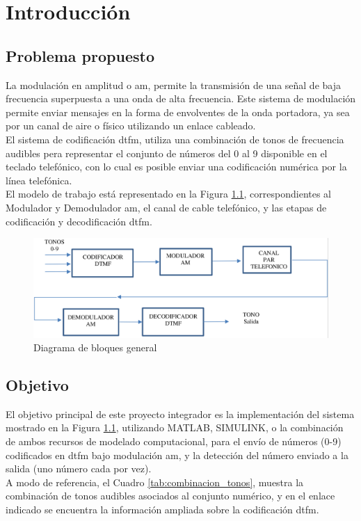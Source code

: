 \chapter{Introducción}
\section{Problema propuesto}
La modulación en amplitud o \gls{am},
permite la transmisión de una señal de
baja frecuencia superpuesta a una onda
de alta frecuencia. Este sistema de
modulación permite enviar mensajes en
la forma de envolventes de la onda
portadora, ya sea por un canal de aire o
físico utilizando un enlace cableado.\\
El sistema de codificación \gls{dtfm}, utiliza una
combinación de tonos de frecuencia
audibles pera representar el conjunto de
números del 0 al 9 disponible en el
teclado telefónico, con lo cual es posible
enviar una codificación numérica por la
línea telefónica.\\
El modelo de trabajo está representado
en la Figura \ref{fig:intro_diagrama_bloques}, correspondientes al
Modulador y Demodulador \gls{am}, el canal
de cable telefónico, y las etapas de
codificación y decodificación \gls{dtfm}.

\begin{figure}[ht]
  \centering
  \includegraphics[width=\linewidth]{images/intro_diagrama_general.png}
  \caption{Diagrama de bloques general}
  \label{fig:intro_diagrama_bloques}
\end{figure}

\section{Objetivo}
El objetivo principal de este proyecto
integrador es la implementación del
sistema mostrado en la Figura \ref{fig:intro_diagrama_bloques},
utilizando MATLAB, SIMULINK, o la
combinación de ambos recursos de
modelado computacional, para el
envío de números (0-9) codificados
en \gls{dtfm} bajo modulación \gls{am}, y la
detección del número enviado a la
salida (uno número cada por vez).\\
A modo de referencia, el Cuadro \ref{tab:combinacion_tonos},
muestra la combinación de tonos
audibles asociados al conjunto
numérico, y en el enlace indicado
se encuentra la información ampliada
sobre la codificación \gls{dtfm}.

